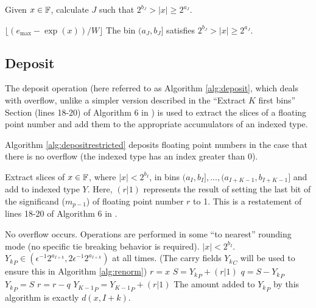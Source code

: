     \begin{samepage}
    \begin{alg}
      Given $x \in \mathbb{F}$, calculate $J$ such that $2^{b_J} > |x| \geq 2^{a_J}$.
      \begin{algorithmic}[1]
          \State \Return $\lfloor(e_{\max} - \exp(x))/W\rfloor$
        \EndFunction
        \Ensure
          \Statex The bin $(a_{J}, b_{J}]$ satisfies $2^{b_{J}} > |x| \geq 2^{a_{J}}$.
      \end{algorithmic}
      \label{alg:index}
    \end{alg}
     \end{samepage}

  \subsection{Deposit}
    \label{sec:primitiveops_deposit}
    The deposit operation (here referred to as Algorithm \ref{alg:deposit}, which deals with overflow, unlike a simpler version described in the ``Extract $K$ first bins'' Section (lines 18-20) of Algorithm $6$ in \cite{repsum}) is used to extract the slices of a floating point number and add them to the appropriate accumulators of an indexed type.

    Algorithm \ref{alg:depositrestricted} deposits floating point numbers in the case that there is no overflow (the indexed type has an index greater than 0).

      \begin{samepage}
      \begin{alg}
        Extract slices of $x \in \mathbb{F}$, where $|x| < 2^{b_I}$, in bins $(a_I, b_I], ..., (a_{I + K - 1}, b_{I + K - 1}]$ and add to indexed type $Y$. Here, $(r | 1)$ represents the result of setting the last bit of the significand ($m_{p - 1}$) of floating point number $r$ to 1. This is a restatement of lines 18-20 of Algorithm $6$ in \cite{repsum}.
        \begin{algorithmic}[1]
          \Require
          \Statex No overflow occurs.
          \Statex Operations are performed in some ``to nearest'' rounding mode (no specific tie breaking behavior is required).
          \Statex $|x| < 2^{b_I}$.
          \Statex ${Y_k}_P \in (\epsilon^{-1}  2^{a_{I + k}}, 2  \epsilon^{-1}  2^{a_{I + k}})$ at all times. (The carry fields ${Y_k}_C$ will be used to ensure this in Algorithm \ref{alg:renorm})
            \State $r = x$ \label{alg:depositrestricted:rgetsx}
             \label{alg:depositrestricted:loop}
              \State $S = {Y_k}_P + (r | 1)$ \label{alg:depositrestricted:split}
              \State $q = S - {Y_k}_P$
              \State ${Y_k}_P = S$
              \State $r = r - q$\label{alg:depositrestricted:endsplit}
            \EndFor
            \State ${Y_{K - 1}}_P = {Y_{K - 1}}_P + (r | 1)$
          \EndFunction
          \Ensure
          \Statex The amount added to ${Y_k}_P$ by this algorithm is exactly $d(x, I + k)$.
        \end{algorithmic}
        \label{alg:depositrestricted}
      \end{alg}
      \end{samepage}

